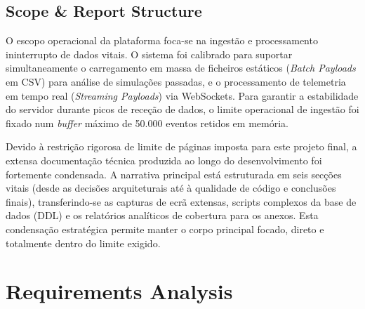 \documentclass[11pt,a4paper]{article}
\begin{document}
\subsection{Scope \& Report Structure}
O escopo operacional da plataforma foca-se na ingestão e processamento ininterrupto de dados vitais. O sistema foi calibrado para suportar simultaneamente o carregamento em massa de ficheiros estáticos (\textit{Batch Payloads} em CSV) para análise de simulações passadas, e o processamento de telemetria em tempo real (\textit{Streaming Payloads}) via WebSockets. Para garantir a estabilidade do servidor durante picos de receção de dados, o limite operacional de ingestão foi fixado num \textit{buffer} máximo de 50.000 eventos retidos em memória.

Devido à restrição rigorosa de limite de páginas imposta para este projeto final, a extensa documentação técnica produzida ao longo do desenvolvimento foi fortemente condensada. A narrativa principal está estruturada em seis secções vitais (desde as decisões arquiteturais até à qualidade de código e conclusões finais), transferindo-se as capturas de ecrã extensas, scripts complexos da base de dados (DDL) e os relatórios analíticos de cobertura para os anexos. Esta condensação estratégica permite manter o corpo principal focado, direto e totalmente dentro do limite exigido.

\section{Requirements Analysis}
\end{document}

